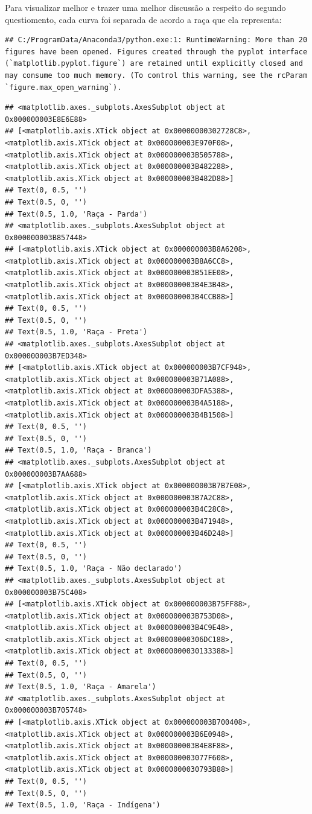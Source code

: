 \documentclass[
  oneside]{book}
\begin{document}
Para visualizar melhor e trazer uma melhor discussão a respeito do segundo questiomento, cada curva foi separada de acordo a raça que ela representa:

\begin{verbatim}
## C:/ProgramData/Anaconda3/python.exe:1: RuntimeWarning: More than 20 figures have been opened. Figures created through the pyplot interface (`matplotlib.pyplot.figure`) are retained until explicitly closed and may consume too much memory. (To control this warning, see the rcParam `figure.max_open_warning`).
\end{verbatim}

\begin{verbatim}
## <matplotlib.axes._subplots.AxesSubplot object at 0x000000003E8E6E88>
## [<matplotlib.axis.XTick object at 0x00000000302728C8>, <matplotlib.axis.XTick object at 0x000000003E970F08>, <matplotlib.axis.XTick object at 0x000000003B505788>, <matplotlib.axis.XTick object at 0x000000003B482288>, <matplotlib.axis.XTick object at 0x000000003B482D88>]
## Text(0, 0.5, '')
## Text(0.5, 0, '')
## Text(0.5, 1.0, 'Raça - Parda')
## <matplotlib.axes._subplots.AxesSubplot object at 0x000000003B857448>
## [<matplotlib.axis.XTick object at 0x000000003B8A6208>, <matplotlib.axis.XTick object at 0x000000003B8A6CC8>, <matplotlib.axis.XTick object at 0x000000003B51EE08>, <matplotlib.axis.XTick object at 0x000000003B4E3B48>, <matplotlib.axis.XTick object at 0x000000003B4CCB88>]
## Text(0, 0.5, '')
## Text(0.5, 0, '')
## Text(0.5, 1.0, 'Raça - Preta')
## <matplotlib.axes._subplots.AxesSubplot object at 0x000000003B7ED348>
## [<matplotlib.axis.XTick object at 0x000000003B7CF948>, <matplotlib.axis.XTick object at 0x000000003B71A088>, <matplotlib.axis.XTick object at 0x000000003DFA5388>, <matplotlib.axis.XTick object at 0x000000003B4A5188>, <matplotlib.axis.XTick object at 0x000000003B4B1508>]
## Text(0, 0.5, '')
## Text(0.5, 0, '')
## Text(0.5, 1.0, 'Raça - Branca')
## <matplotlib.axes._subplots.AxesSubplot object at 0x000000003B7AA688>
## [<matplotlib.axis.XTick object at 0x000000003B7B7E08>, <matplotlib.axis.XTick object at 0x000000003B7A2C88>, <matplotlib.axis.XTick object at 0x000000003B4C28C8>, <matplotlib.axis.XTick object at 0x000000003B471948>, <matplotlib.axis.XTick object at 0x000000003B46D248>]
## Text(0, 0.5, '')
## Text(0.5, 0, '')
## Text(0.5, 1.0, 'Raça - Não declarado')
## <matplotlib.axes._subplots.AxesSubplot object at 0x000000003B75C408>
## [<matplotlib.axis.XTick object at 0x000000003B75FF88>, <matplotlib.axis.XTick object at 0x000000003B753D08>, <matplotlib.axis.XTick object at 0x000000003B4C9E48>, <matplotlib.axis.XTick object at 0x00000000306DC188>, <matplotlib.axis.XTick object at 0x0000000030133388>]
## Text(0, 0.5, '')
## Text(0.5, 0, '')
## Text(0.5, 1.0, 'Raça - Amarela')
## <matplotlib.axes._subplots.AxesSubplot object at 0x000000003B705748>
## [<matplotlib.axis.XTick object at 0x000000003B700408>, <matplotlib.axis.XTick object at 0x000000003B6E0948>, <matplotlib.axis.XTick object at 0x000000003B4E8F88>, <matplotlib.axis.XTick object at 0x000000003077F608>, <matplotlib.axis.XTick object at 0x0000000030793B88>]
## Text(0, 0.5, '')
## Text(0.5, 0, '')
## Text(0.5, 1.0, 'Raça - Indígena')
\end{verbatim}
\end{document}
